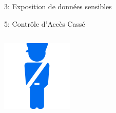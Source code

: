 \documentclass[final,hyperref={pdfpagelabels=false}]{beamer}
\begin{document}
\begin{frame}[t]
\begin{columns}[t]
\begin{column}{.465\textwidth}
\begin{block}{3: Exposition de données sensibles}
\end{block}


\begin{block}{5: Contrôle d'Accès Cassé}
	\begin{columns}[T]

		\begin{column}{.12\textwidth} %
			\includegraphics[scale=1.35]{access.png}
		\end{column}


\end{columns}
\end{block}
\end{column}
\end{columns}
\end{frame}
\end{document}
